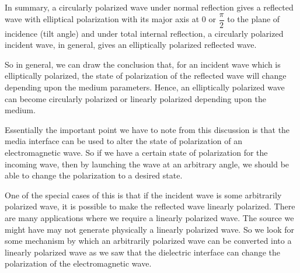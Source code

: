 In summary, a circularly polarized wave under normal reflection gives a reflected wave with elliptical polarization with its major axis at 0 or $\dfrac{\pi}{2}$ to the plane of incidence (tilt angle) and under total internal reflection, a circularly polarized incident wave, in general, gives an elliptically polarized reflected wave.

So in general, we can draw the conclusion that, for an incident wave which is elliptically polarized, the state of polarization of the reflected wave will change depending upon the medium parameters. Hence, an elliptically polarized wave can become circularly polarized or linearly polarized depending upon the medium.

Essentially the important point we have to note from this discussion is that the media interface can be used to alter the state of polarization of an electromagnetic wave. So if we have a certain state of polarization for the incoming wave, then by launching the wave at an arbitrary angle, we should be able to change the polarization to a desired state.

One of the special cases of this is that if the incident wave is some arbitrarily polarized wave, it is possible to make the reflected wave linearly polarized. There are many applications where we require a linearly polarized wave. The source we might have may not generate physically a linearly polarized wave.  So we look for some mechanism by which an arbitrarily polarized wave can be converted into a linearly polarized wave as we saw that the dielectric interface can change the polarization of the electromagnetic wave.

